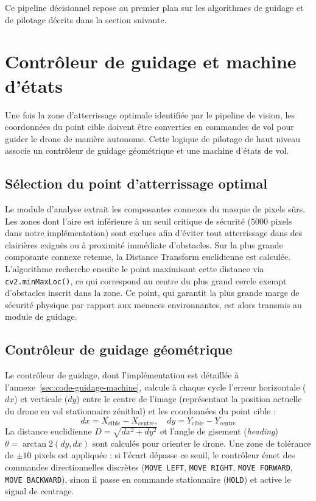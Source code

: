 Ce pipeline décisionnel repose au premier plan sur les algorithmes de guidage et de pilotage décrits dans la section suivante.

\section{Contrôleur de guidage et machine d'états}
\label{sec:guidage-state-machine}

Une fois la zone d'atterrissage optimale identifiée par le pipeline de vision, les coordonnées du point cible doivent être converties en commandes de vol pour guider le drone de manière autonome. Cette logique de pilotage de haut niveau associe un contrôleur de guidage géométrique et une machine d'états de vol.

\subsection{Sélection du point d'atterrissage optimal}

Le module d'analyse extrait les composantes connexes du masque de pixels sûrs. Les zones dont l'aire est inférieure à un seuil critique de sécurité ($5000$ pixels dans notre implémentation) sont exclues afin d'éviter tout atterrissage dans des clairières exiguës ou à proximité immédiate d'obstacles. Sur la plus grande composante connexe retenue, la Distance Transform euclidienne est calculée. L'algorithme recherche ensuite le point maximisant cette distance via \texttt{cv2.minMaxLoc()}, ce qui correspond au centre du plus grand cercle exempt d'obstacles inscrit dans la zone. Ce point, qui garantit la plus grande marge de sécurité physique par rapport aux menaces environnantes, est alors transmis au module de guidage.

\subsection{Contrôleur de guidage géométrique}

Le contrôleur de guidage, dont l'implémentation est détaillée à l'annexe~\ref{sec:code-guidage-machine}, calcule à chaque cycle l'erreur horizontale ($dx$) et verticale ($dy$) entre le centre de l'image (représentant la position actuelle du drone en vol stationnaire zénithal) et les coordonnées du point cible :
\begin{equation}
  dx = X_{\text{cible}} - X_{\text{centre}}, \quad dy = Y_{\text{cible}} - Y_{\text{centre}}
\end{equation}
La distance euclidienne $D = \sqrt{dx^2 + dy^2}$ et l'angle de gisement (\textit{heading}) $\theta = \arctan2(dy, dx)$ sont calculés pour orienter le drone. Une zone de tolérance de $\pm 10$ pixels est appliquée : si l'écart dépasse ce seuil, le contrôleur émet des commandes directionnelles discrètes (\texttt{MOVE LEFT}, \texttt{MOVE RIGHT}, \texttt{MOVE FORWARD}, \texttt{MOVE BACKWARD}), sinon il passe en commande stationnaire (\texttt{HOLD}) et active le signal de centrage.

